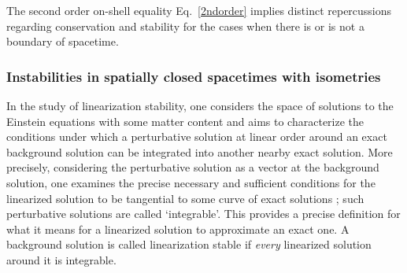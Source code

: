 \documentclass[]{jkpaper}
\theoremstyle{plain}
\theoremstyle{definition}
\begin{document}
The second order on-shell equality Eq.~\eqref{2ndorder} implies distinct repercussions regarding conservation and stability for the cases when there is or is not a boundary of spacetime.


\subsubsection{Instabilities in spatially closed spacetimes with isometries}\label{sssec_instacompact}


In the study of linearization stability, one considers the space of solutions to the Einstein equations with some matter content and aims to characterize the conditions under which a perturbative solution at linear order around an exact background solution can be integrated into another nearby exact solution. More precisely, considering the perturbative solution as a vector at the background solution, one examines the precise necessary and sufficient conditions for the linearized solution to be tangential to some curve of exact solutions \cite{Deser:1973zza,Moncrief1,Moncrief:1976un,Moncrief:1978te,Moncrief:1979bg,Arms1,Arms:1979au,fischer1980structure,Arms:1982ea,Marsden_lectures,Saraykar:1981qm,Higuchi:1991tk,Higuchi:1991tm,Losic:2006ht}; such perturbative solutions are called `integrable'. This provides a precise definition for what it means for a linearized solution to approximate an exact one. A background solution  is called linearization stable if \emph{every} linearized solution around it is integrable.
\end{document}
